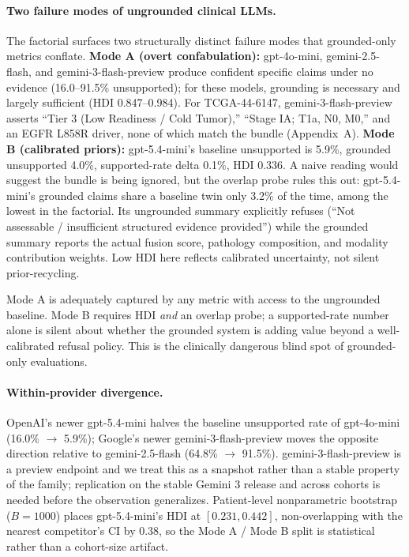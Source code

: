\documentclass{article}
\theoremstyle{plain}
\begin{document}
\paragraph{Two failure modes of ungrounded clinical LLMs.} The factorial surfaces two structurally distinct failure modes that grounded-only metrics conflate.
\textbf{Mode A (overt confabulation):} gpt-4o-mini, gemini-2.5-flash, and gemini-3-flash-preview produce confident specific claims under no evidence (16.0--91.5\% unsupported); for these models, grounding is necessary and largely sufficient (HDI 0.847--0.984). For TCGA-44-6147, gemini-3-flash-preview asserts ``Tier 3 (Low Readiness / Cold Tumor),'' ``Stage IA; T1a, N0, M0,'' and an EGFR L858R driver, none of which match the bundle (Appendix~A).
\textbf{Mode B (calibrated priors):} gpt-5.4-mini's baseline unsupported is 5.9\%, grounded unsupported 4.0\%, supported-rate delta 0.1\%, HDI 0.336. A naive reading would suggest the bundle is being ignored, but the overlap probe rules this out: gpt-5.4-mini's grounded claims share a baseline twin only 3.2\% of the time, among the lowest in the factorial. Its ungrounded summary explicitly refuses (``Not assessable / insufficient structured evidence provided'') while the grounded summary reports the actual fusion score, pathology composition, and modality contribution weights. Low HDI here reflects calibrated uncertainty, not silent prior-recycling.

Mode A is adequately captured by any metric with access to the ungrounded baseline. Mode B requires HDI \emph{and} an overlap probe; a supported-rate number alone is silent about whether the grounded system is adding value beyond a well-calibrated refusal policy. This is the clinically dangerous blind spot of grounded-only evaluations.

\paragraph{Within-provider divergence.} OpenAI's newer gpt-5.4-mini halves the baseline unsupported rate of gpt-4o-mini (16.0\% $\to$ 5.9\%); Google's newer gemini-3-flash-preview moves the opposite direction relative to gemini-2.5-flash (64.8\% $\to$ 91.5\%). gemini-3-flash-preview is a preview endpoint and we treat this as a snapshot rather than a stable property of the family; replication on the stable Gemini 3 release and across cohorts is needed before the observation generalizes. Patient-level nonparametric bootstrap ($B{=}1000$) places gpt-5.4-mini's HDI at $[0.231, 0.442]$, non-overlapping with the nearest competitor's CI by 0.38, so the Mode A / Mode B split is statistical rather than a cohort-size artifact.
\end{document}
